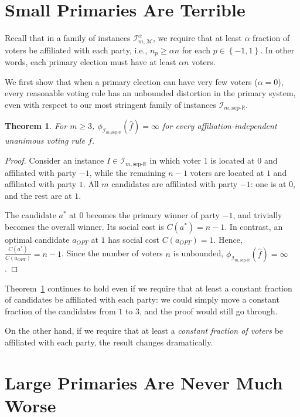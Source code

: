 \documentclass[letterpaper]{article} %
\newtheorem{theorem}{Theorem}
\theoremstyle{definition}
\newcommand{\set}[1]{\left\{#1\right\}}
\renewcommand{\hat}{\widehat}
\newcommand{\bbR}{\mathbb{R}}
\newcommand{\calI}{\mathcal{I}}
\newcommand{\calM}{\mathcal{M}}
\newcommand{\pleft}{-1}
\newcommand{\pright}{1}
\newcommand{\sep}{\textrm{sep-}}
\newcommand{\eucline}{\bbR}
\newcommand{\euclinesep}{\sep\eucline}
\newcommand{\I}{\calI}
\begin{document}
\section{Small Primaries Are Terrible}
\label{sec:small-primaries}

Recall that in a family of instances $\I_{m,\calM}^{\alpha}$, we require that at least $\alpha$ fraction of voters be affiliated with each party, i.e., $n_p \ge \alpha n$ for each $p \in \set{\pleft,\pright}$. In other words, each primary election must have at least $\alpha n$ voters. 

We first show that when a primary election can have very few voters ($\alpha = 0$), every reasonable voting rule has an unbounded distortion in the primary system, even with respect to our most stringent family of instances $\I_{m,\euclinesep}$. 
\begin{theorem}
	For $m \ge 3$, $\phi_{\I_{m,\euclinesep}}(\hat{f}) = \infty$ for every affiliation-independent unanimous voting rule $f$.
\label{thm:small-primaries-bad}
\end{theorem}
\begin{proof}
	Consider an instance $I \in \I_{m,\euclinesep}$ in which voter $1$ is located at $0$ and affiliated with party $\pleft$, while the remaining $n-1$ voters are located at $1$ and affiliated with party $\pright$. All $m$ candidates are affiliated with party $\pleft$: one is at $0$, and the rest are at $1$.
	
	The candidate $a^*$ at $0$ becomes the primary winner of party $\pleft$, and trivially becomes the overall winner. Its social cost is $C(a^*) = n-1$. In contrast, an optimal candidate $a_{OPT}$ at $1$ has social cost $C(a_{OPT}) = 1$. Hence, $\frac{C(a^*)}{C(a_{OPT})} = n-1$. Since the number of voters $n$ is unbounded, $\phi_{\I_{m,\euclinesep}}(\hat{f}) = \infty$.
\end{proof}

Theorem~\ref{thm:small-primaries-bad} continues to hold even if we require that at least a constant fraction of candidates be affiliated with each party: we could simply move a constant fraction of the candidates from $1$ to $3$, and the proof would still go through. 

On the other hand, if we require that at least a \emph{constant fraction of voters} be affiliated with each party, the result changes dramatically.

\section{Large Primaries Are Never Much Worse}
\label{sec:large-primaries-good}
\end{document}
